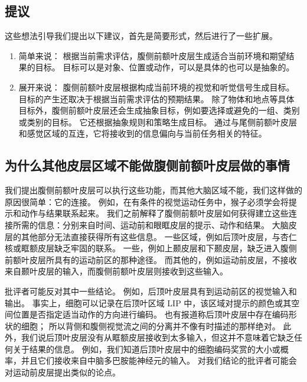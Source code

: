 \subsection{提议}
\par

这些想法引导我们提出以下建议，首先是简要形式，然后进行了一些扩展。
\begin{enumerate}
\item 简单来说：
根据当前需求评估，腹侧前额叶皮层生成适合当前环境和期望结果的目标。 
目标可以是对象、位置或动作，可以是具体的也可以是抽象的。
\item  展开来说：
腹侧前额叶皮层根据构成当前环境的视觉和听觉信号生成目标。
目标的产生还取决于根据当前需求评估的预期结果。 
除了物体和地点等具体目标外，腹侧前额叶皮层还会生成抽象目标，例如要选择或避免的一组、类别或类别的目标。 
它还根据抽象规则和策略生成目标。 通过与尾侧前额叶皮层和感觉区域的互连，它将接收到的信息偏向与当前任务相关的特征。
\end{enumerate}



\subsection{为什么其他皮层区域不能做腹侧前额叶皮层做的事情}
\par

我们提出腹侧前额叶皮层可以执行这些功能，而其他大脑区域不能，我们这样做的原因很简单：它的连接。
例如，在有条件的视觉运动任务中，猴子必须学会将提示和动作与结果联系起来。
我们之前解释了腹侧前额叶皮层如何获得建立这些连接所需的信息：分别来自时间、运动前和眼眶皮层的提示、动作和结果。
大脑皮层的其他部分无法直接获得所有这些信息。
一些区域，例如后顶叶皮层，与杏仁核或眶额皮层缺乏牢固的联系。
一些，例如上颞皮层和下颞皮层，缺乏进入腹侧前额叶皮层所具有的运动前区的那种途径。
而其他的，例如运动前皮层，不接收来自颞叶皮层的输入，而腹侧前额叶皮层则接收到这些输入。
\par


批评者可能反对其中一些结论。
例如，后顶叶皮层具有到运动前区的视觉输入和输出。
事实上，细胞可以记录在后顶叶区域 LIP 中，该区域对提示的颜色或其空间位置是否指定适当动作的方向进行编码\cite{toth2002dynamic}。
也有报道称后顶叶皮层中存在编码形状的细胞\cite{janssen2008coding}； 所以背侧和腹侧视觉流之间的分离并不像有时描述的那样绝对。
此外，我们说后顶叶皮层没有从眶额皮层接收到太多输入，但这并不意味着它缺乏任何关于结果的信息。
例如，我们知道后顶叶皮层中的细胞编码奖赏的大小或概率\cite{platt1999neural}，并且它们接收来自中脑多巴胺能神经元的输入。
对我们结论的批评者可能会对运动前皮层提出类似的论点。
\par


